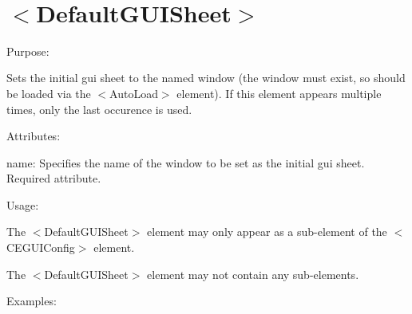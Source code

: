 ~\newline
 \hypertarget{xml_config_xml_config_guisheet}{}\section{$<$\+Default\+G\+U\+I\+Sheet$>$}\label{xml_config_xml_config_guisheet}

\begin{DoxyItemize}
\item Purpose\+:
\begin{DoxyItemize}
\item Sets the initial gui sheet to the named window (the window must exist, so should be loaded via the $<$Auto\+Load$>$ element). If this element appears multiple times, only the last occurence is used.
\end{DoxyItemize}
\item Attributes\+:
\begin{DoxyItemize}
\item {\ttfamily name\+:} Specifies the name of the window to be set as the initial gui sheet. Required attribute.
\end{DoxyItemize}
\item Usage\+:
\begin{DoxyItemize}
\item The $<$Default\+G\+U\+I\+Sheet$>$ element may only appear as a sub-\/element of the $<$C\+E\+G\+U\+I\+Config$>$ element.
\item The $<$Default\+G\+U\+I\+Sheet$>$ element may not contain any sub-\/elements.
\end{DoxyItemize}
\item Examples\+: 
\end{DoxyItemize}